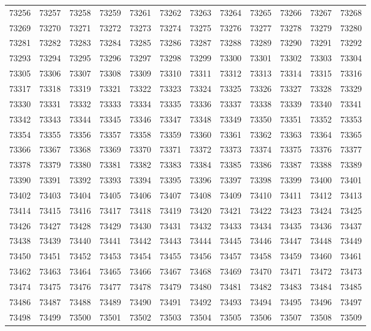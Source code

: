\begin{center}
\begin{longtable}{llllllllllll}
73256 &73257 &73258 &73259 &73261 &73262 &73263 &73264 &73265 &73266 &73267 &73268 \\
73269 &73270 &73271 &73272 &73273 &73274 &73275 &73276 &73277 &73278 &73279 &73280 \\
73281 &73282 &73283 &73284 &73285 &73286 &73287 &73288 &73289 &73290 &73291 &73292 \\
73293 &73294 &73295 &73296 &73297 &73298 &73299 &73300 &73301 &73302 &73303 &73304 \\
73305 &73306 &73307 &73308 &73309 &73310 &73311 &73312 &73313 &73314 &73315 &73316 \\
73317 &73318 &73319 &73321 &73322 &73323 &73324 &73325 &73326 &73327 &73328 &73329 \\
73330 &73331 &73332 &73333 &73334 &73335 &73336 &73337 &73338 &73339 &73340 &73341 \\
73342 &73343 &73344 &73345 &73346 &73347 &73348 &73349 &73350 &73351 &73352 &73353 \\
73354 &73355 &73356 &73357 &73358 &73359 &73360 &73361 &73362 &73363 &73364 &73365 \\
73366 &73367 &73368 &73369 &73370 &73371 &73372 &73373 &73374 &73375 &73376 &73377 \\
73378 &73379 &73380 &73381 &73382 &73383 &73384 &73385 &73386 &73387 &73388 &73389 \\
73390 &73391 &73392 &73393 &73394 &73395 &73396 &73397 &73398 &73399 &73400 &73401 \\
73402 &73403 &73404 &73405 &73406 &73407 &73408 &73409 &73410 &73411 &73412 &73413 \\
73414 &73415 &73416 &73417 &73418 &73419 &73420 &73421 &73422 &73423 &73424 &73425 \\
73426 &73427 &73428 &73429 &73430 &73431 &73432 &73433 &73434 &73435 &73436 &73437 \\
73438 &73439 &73440 &73441 &73442 &73443 &73444 &73445 &73446 &73447 &73448 &73449 \\
73450 &73451 &73452 &73453 &73454 &73455 &73456 &73457 &73458 &73459 &73460 &73461 \\
73462 &73463 &73464 &73465 &73466 &73467 &73468 &73469 &73470 &73471 &73472 &73473 \\
73474 &73475 &73476 &73477 &73478 &73479 &73480 &73481 &73482 &73483 &73484 &73485 \\
73486 &73487 &73488 &73489 &73490 &73491 &73492 &73493 &73494 &73495 &73496 &73497 \\
73498 &73499 &73500 &73501 &73502 &73503 &73504 &73505 &73506 &73507 &73508 &73509 \\

\end{longtable}
\end{center}
